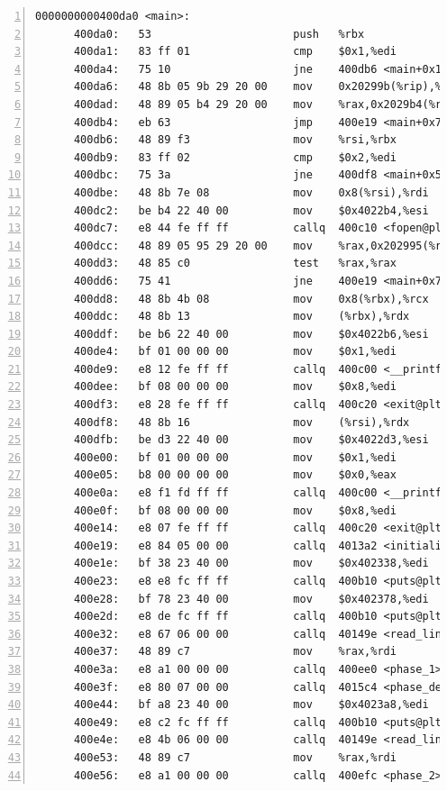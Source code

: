 \documentclass{article}
\begin{document}
\begin{lstlisting}[title = bomb的反汇编代码及部分注释, xleftmargin = 2em,xrightmargin = 2em, aboveskip = 1em, numbers = left, basicstyle=\scriptsize\ttfamily, numberstyle=\scriptsize]
    0000000000400da0 <main>:
      400da0:	53                   	push   %rbx
      400da1:	83 ff 01             	cmp    $0x1,%edi
      400da4:	75 10                	jne    400db6 <main+0x16>
      400da6:	48 8b 05 9b 29 20 00 	mov    0x20299b(%rip),%rax        # 603748 <stdin@@GLIBC_2.2.5>
      400dad:	48 89 05 b4 29 20 00 	mov    %rax,0x2029b4(%rip)        # 603768 <infile>
      400db4:	eb 63                	jmp    400e19 <main+0x79>
      400db6:	48 89 f3             	mov    %rsi,%rbx
      400db9:	83 ff 02             	cmp    $0x2,%edi
      400dbc:	75 3a                	jne    400df8 <main+0x58>
      400dbe:	48 8b 7e 08          	mov    0x8(%rsi),%rdi
      400dc2:	be b4 22 40 00       	mov    $0x4022b4,%esi
      400dc7:	e8 44 fe ff ff       	callq  400c10 <fopen@plt>
      400dcc:	48 89 05 95 29 20 00 	mov    %rax,0x202995(%rip)        # 603768 <infile>
      400dd3:	48 85 c0             	test   %rax,%rax
      400dd6:	75 41                	jne    400e19 <main+0x79>
      400dd8:	48 8b 4b 08          	mov    0x8(%rbx),%rcx
      400ddc:	48 8b 13             	mov    (%rbx),%rdx
      400ddf:	be b6 22 40 00       	mov    $0x4022b6,%esi
      400de4:	bf 01 00 00 00       	mov    $0x1,%edi
      400de9:	e8 12 fe ff ff       	callq  400c00 <__printf_chk@plt>
      400dee:	bf 08 00 00 00       	mov    $0x8,%edi
      400df3:	e8 28 fe ff ff       	callq  400c20 <exit@plt>
      400df8:	48 8b 16             	mov    (%rsi),%rdx
      400dfb:	be d3 22 40 00       	mov    $0x4022d3,%esi
      400e00:	bf 01 00 00 00       	mov    $0x1,%edi
      400e05:	b8 00 00 00 00       	mov    $0x0,%eax
      400e0a:	e8 f1 fd ff ff       	callq  400c00 <__printf_chk@plt>
      400e0f:	bf 08 00 00 00       	mov    $0x8,%edi
      400e14:	e8 07 fe ff ff       	callq  400c20 <exit@plt>
      400e19:	e8 84 05 00 00       	callq  4013a2 <initialize_bomb>
      400e1e:	bf 38 23 40 00       	mov    $0x402338,%edi
      400e23:	e8 e8 fc ff ff       	callq  400b10 <puts@plt>
      400e28:	bf 78 23 40 00       	mov    $0x402378,%edi
      400e2d:	e8 de fc ff ff       	callq  400b10 <puts@plt>
      400e32:	e8 67 06 00 00       	callq  40149e <read_line>
      400e37:	48 89 c7             	mov    %rax,%rdi
      400e3a:	e8 a1 00 00 00       	callq  400ee0 <phase_1>
      400e3f:	e8 80 07 00 00       	callq  4015c4 <phase_defused>
      400e44:	bf a8 23 40 00       	mov    $0x4023a8,%edi
      400e49:	e8 c2 fc ff ff       	callq  400b10 <puts@plt>
      400e4e:	e8 4b 06 00 00       	callq  40149e <read_line>
      400e53:	48 89 c7             	mov    %rax,%rdi
      400e56:	e8 a1 00 00 00       	callq  400efc <phase_2>

\end{lstlisting}
\end{document}
